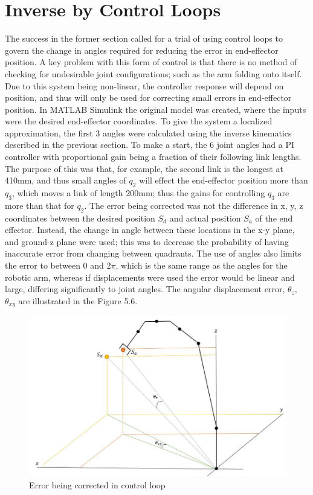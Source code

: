 \documentclass[12pt,openany,a4paper]{book}
\begin{document}
\section{Inverse by Control Loops}
The success in the former section called for a trial of using control loops to govern the change in angles required for reducing the error in end-effector position. A key problem with this form of control is that there is no method of checking for undesirable joint configurations; such as the arm folding onto itself. Due to this system being non-linear, the controller response will depend on position, and thus will only be used for correcting small errors in end-effector position. In MATLAB Simulink the original model was created, where the inputs were the desired end-effector coordinates. To give the system a localized approximation, the first 3 angles were calculated using the inverse kinematics described in the previous section. To make a start, the 6 joint angles had a PI controller with proportional gain being a fraction of their following link lengths. The purpose of this was that, for example, the second link is the longest at 410mm, and thus small angles of $q_2$ will effect the end-effector position more than $q_3$, which moves a link of length 200mm; thus the gains for controlling $q_3$ are more than that for $q_2$. The error being corrected was not the difference in x, y, z coordinates between the desired position $S_d$ and actual position $S_a$ of the end effector. Instead, the change in angle between these locations in the x-y plane, and ground-z plane were used; this was to decrease the probability of having inaccurate error from changing between quadrants. The use of angles also limits the error to between 0 and $2\pi$, which is the same range as the angles for the robotic arm, whereas if displacements were used the error would be linear and large, differing significantly to joint angles. The angular displacement error, $\theta_z$, $\theta_{xy}$ are illustrated in the Figure 5.6.

\clearpage

\begin{center}
\begin{figure}[htb]
  \includegraphics[width=1\linewidth]{jaco_inv_control_figure.jpg}
\caption{Error being corrected in control loop}
\end{figure}
\end{center}
\end{document}
